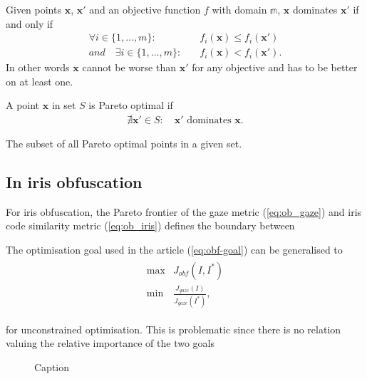 \begin{definition}[Dominance]\label{def:dominance}
Given points $\mathbf{x}$, $\mathbf{x'}$ and an objective function $f$ with domain $\mathbb{m}$, $\mathbf{x}$ dominates $\mathbf{x'}$ if and only if
\begin{align}
 \forall i \in \{1, \dots, m\} :&\quad f_i(\mathbf{x})\leq f_i(\mathbf{x'}) \\
and \quad \exists i \in \{1, \dots, m\} :&\quad f_i(\mathbf{x}) < f_i(\mathbf{x'}).
\end{align}
In other words $\mathbf{x}$ cannot be worse than $\mathbf{x'}$ for any objective and has to be better on at least one.
\end{definition}

\begin{definition}\label{def:p-optimal}
A point $\mathbf{x}$ in set $S$ is Pareto optimal if
\begin{align}
    \nexists \mathbf{x'} \in S: \quad \mathbf{x'} \text{ dominates } \mathbf{x}.
\end{align}
\end{definition}

\begin{definition}\label{def:p-frontier}
The subset of all Pareto optimal points in a given set.
\end{definition}

\subsection{In iris obfuscation}
For iris obfuscation, the Pareto frontier of the gaze metric (\cref{eq:ob_gaze}) and iris code similarity metric (\cref{eq:ob_iris}) defines the boundary between 



The optimisation goal used in the article (\cref{eq:obf-goal}) can be generalised to 
\begin{align}
	\begin{aligned}
    \max & J_{obf}(I, I^*)\\
    \min & \frac{J_{gaze}(I)}{J_{gaze}(I^*)},
\end{aligned}
\end{align}

for unconstrained optimisation. This is problematic since there is no relation valuing the relative importance of the two goals

\begin{figure}
    \centering
    \caption{Caption}
    \label{fig:my_label}
\end{figure}



